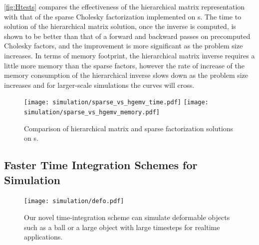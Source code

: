 
\autoref{fig:Htests} compares the effectiveness of the hierarchical matrix representation with that of the sparse Cholesky factorization implemented on s. The time to solution of the hierarchical matrix solution, once the inverse is computed, is shown to be better than that of a forward and backward passes on precomputed Cholesky factors, and the improvement is more significant as the problem size increases. In terms of memory footprint, the hierarchical matrix inverse requires a little more memory than the sparse factors, however the rate of increase of the memory consumption of the hierarchical inverse slows down as the problem size increases and for larger-scale simulations the curves will cross.

\begin{figure}
  \centering%
  \texttt{[image: simulation/sparse\_vs\_hgemv\_time.pdf]}
  \qquad\qquad%
  \texttt{[image: simulation/sparse\_vs\_hgemv\_memory.pdf]}
  \caption{Comparison of hierarchical matrix and sparse factorization solutions on s.}\label{fig:Htests}
\end{figure}


\subsection{Faster Time Integration Schemes for Simulation}
\begin{figure}[ht]
  \centering
  \texttt{[image: simulation/defo.pdf]}
  \caption{Our novel time-integration scheme  can simulate deformable objects such as a ball or a large object with large timesteps for realtime applications.}\label{fig:pbdd}
\end{figure}

